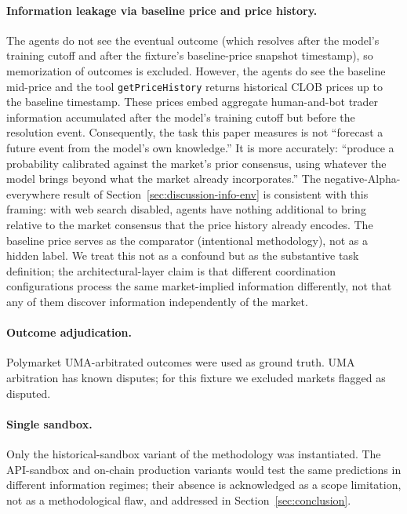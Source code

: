 \documentclass[11pt]{article}
\begin{document}
\paragraph{Information leakage via baseline price and price history.} The agents do not see the eventual outcome (which resolves after the model's training cutoff and after the fixture's baseline-price snapshot timestamp), so memorization of outcomes is excluded. However, the agents do see the baseline mid-price and the tool \texttt{getPriceHistory} returns historical CLOB prices up to the baseline timestamp. These prices embed aggregate human-and-bot trader information accumulated after the model's training cutoff but before the resolution event. Consequently, the task this paper measures is not ``forecast a future event from the model's own knowledge.'' It is more accurately: ``produce a probability calibrated against the market's prior consensus, using whatever the model brings beyond what the market already incorporates.'' The negative-Alpha-everywhere result of Section~\ref{sec:discussion-info-env} is consistent with this framing: with web search disabled, agents have nothing additional to bring relative to the market consensus that the price history already encodes. The baseline price serves as the comparator (intentional methodology), not as a hidden label. We treat this not as a confound but as the substantive task definition; the architectural-layer claim is that different coordination configurations process the same market-implied information differently, not that any of them discover information independently of the market.

\paragraph{Outcome adjudication.} Polymarket UMA-arbitrated outcomes were used as ground truth. UMA arbitration has known disputes; for this fixture we excluded markets flagged as disputed.

\paragraph{Single sandbox.} Only the historical-sandbox variant of the methodology was instantiated. The API-sandbox and on-chain production variants would test the same predictions in different information regimes; their absence is acknowledged as a scope limitation, not as a methodological flaw, and addressed in Section~\ref{sec:conclusion}.

\end{document}
